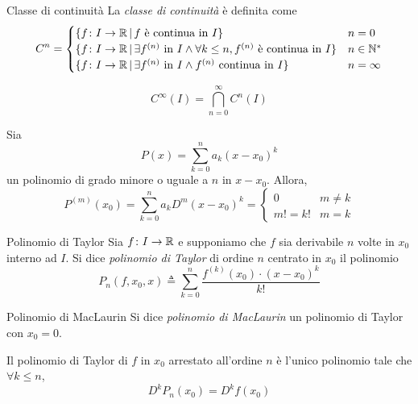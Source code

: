 \documentclass[a4paper]{article}
\begin{document}
\begin{radioactive}
\begin{snippetdefinition}{Classe di continuità}
    La \emph{classe di continuità} è definita come
    \[
        C^n = \begin{cases}
            \{ f \colon I \to \mathbb{R} \,|\, f \text{ è continua in } I \} & n = 0 \\
            \{ f \colon I \to \mathbb{R} \,|\, \exists f^{(n)} \text{ in } I \land \forall k \leq n, f^{(n)} \text{ è continua in } I \} & n \in \mathbb{N}^* \\
            \{ f \colon I \to \mathbb{R} \,|\, \exists f^{(n)} \text{ in } I \land f^{(n)} \text{ continua in } I \} & n = \infty
        \end{cases}
    \]
\end{snippetdefinition}

\[
    C^\infty (I) = \bigcap_{n=0}^\infty C^n(I)
\]

\begin{snippetlemma}{}
    Sia
    \[
        P(x) = \sum_{k=0}^n a_k{(x-x_0)}^k
    \]
    un polinomio di grado minore o uguale a \(n\)
    in \(x-x_0\). Allora,
    \[
        P^{(m)}(x_0) = \sum_{k=0}^n a_k D^m {(x-x_0)}^k
        = \begin{cases}
            0 & m \neq k \\
            m! = k! & m=k
        \end{cases}
    \]
\end{snippetlemma}

\begin{snippetdefinition}{Polinomio di Taylor}
    Sia \(f\colon I \to \mathbb{R}\) e supponiamo che \(f\)
    sia derivabile \(n\) volte in \(x_0\) interno ad \(I\).
    Si dice \emph{polinomio di Taylor} di ordine \(n\) centrato in \(x_0\)
    il polinomio
    \[
        P_n(f, x_0, x) \triangleq \sum_{k=0}^n
        \frac{f^{(k)}(x_0) \cdot {(x-x_0)}^k}{k!}
    \]
\end{snippetdefinition}

\begin{snippetdefinition}{Polinomio di MacLaurin}
    Si dice \emph{polinomio di MacLaurin} un polinomio di Taylor
    con \(x_0=0\).
\end{snippetdefinition}

\begin{snippetproposition}{}
    Il polinomio di Taylor di \(f\) in \(x_0\)
    arrestato all'ordine \(n\) è l'unico polinomio tale che
    \(\forall k \leq n\),
    \[
        D^k P_n(x_0) = D^kf(x_0)
    \]
\end{snippetproposition}


\end{radioactive}
\end{document}
